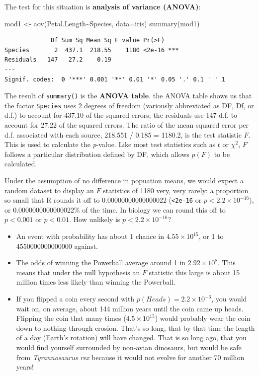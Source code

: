 \documentclass[
  13,
  letterpaper,
]{report}
\newenvironment{Shaded}{\begin{snugshade}}{\end{snugshade}}
\newcommand{\AttributeTok}[1]{\textcolor[rgb]{0.40,0.45,0.13}{#1}}
\newcommand{\FunctionTok}[1]{\textcolor[rgb]{0.28,0.35,0.67}{#1}}
\newcommand{\NormalTok}[1]{\textcolor[rgb]{0.00,0.23,0.31}{#1}}
\newcommand{\OtherTok}[1]{\textcolor[rgb]{0.00,0.23,0.31}{#1}}
\newcommand{\SpecialCharTok}[1]{\textcolor[rgb]{0.37,0.37,0.37}{#1}}
\providecommand{\tightlist}{%
  \setlength{\itemsep}{0pt}\setlength{\parskip}{0pt}}
\begin{document}
The test for this situation is \textbf{analysis of variance (ANOVA)}:

\begin{Shaded}
\begin{Highlighting}[]
\NormalTok{mod1 }\OtherTok{\textless{}{-}} \FunctionTok{aov}\NormalTok{(Petal.Length}\SpecialCharTok{\textasciitilde{}}\NormalTok{Species, }\AttributeTok{data=}\NormalTok{iris)}
\FunctionTok{summary}\NormalTok{(mod1)}
\end{Highlighting}
\end{Shaded}

\begin{verbatim}
             Df Sum Sq Mean Sq F value Pr(>F)    
Species       2  437.1  218.55    1180 <2e-16 ***
Residuals   147   27.2    0.19                   
---
Signif. codes:  0 '***' 0.001 '**' 0.01 '*' 0.05 '.' 0.1 ' ' 1
\end{verbatim}

The result of \texttt{summary()} is the \textbf{ANOVA table}. the ANOVA
table shows us that the factor \texttt{Species} uses 2 degrees of
freedom (variously abbreviated as DF, Df, or d.f.) to account for 437.10
of the squared errors; the residuals use 147 d.f. to account for 27.22
of the squared errors. The ratio of the mean squared error per d.f.
associated with each source, 218.551 / 0.185 = 1180.2, is the test
statistic \(F\). This is used to calculate the \emph{p}-value. Like most
test statistics such as \(t\) or \(\chi^2\), \(F\) follows a particular
distribution defined by DF, which allows \(p(F)\) to be calculated.

Under the assumption of no difference in popuation means, we would
expect a random dataset to display an \(F\) statistics of 1180 very,
very rarely: a proportion so small that R rounds it off to
0.00000000000000022 (\texttt{\textless{}2e-16} or
\(p<2.2\times10^{-16}\)), or 0.0000000000000022\% of the time. In
biology we can round this off to \(p<0.001\) or \(p<0.01\). How unlikely
is \(p<2.2\times10^{-16}\)?

\begin{itemize}
\tightlist
\item
  An event with probability has about 1 chance in \(4.55\times10^{15}\),
  or 1 to 4550000000000000 against.
\item
  The odds of winning the Powerball average around 1 in
  \(2.92\times10^{8}\). This means that under the null hypothesis an
  \(F\) statistic this large is about 15 million times less likely than
  winning the Powerball.
\item
  If you flipped a coin every second with
  \(p\left(Heads\right)=2.2\times10^{-6}\), you would wait on, on
  average, about 144 million years until the coin came up heads.
  Flipping the coin that many times (\(4.5\times10^{15}\)) would
  probably wear the coin down to nothing through erosion. That's so
  long, that by that time the length of a day (Earth's rotation) will
  have changed. That is so long ago, that you would find yourself
  surrounded by non-avian dinosaurs, but would be safe from
  \emph{Tyrannosaurus rex} because it would not evolve for another 70
  million years!
\end{itemize}
\end{document}
